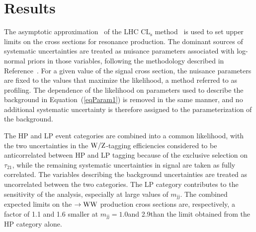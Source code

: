 \newpage
\section{Results}
\label{sec:results1}


The asymptotic approximation~\cite{AsymptCLs} of the LHC
$\mathrm{CL_s}$ method~\cite{CLs1,CLs3} is used to set upper limits on
the cross sections for resonance production. The dominant sources of
systematic uncertainties are treated as nuisance parameters associated
with log-normal priors in those variables, following the methodology
described in Reference~\cite{ATLASCMSstat}. For a given value of the
signal cross section, the nuisance parameters are fixed to the values
that maximize the likelihood, a method referred to as
profiling. The dependence of the likelihood on parameters used to
describe the background in Equation~(\ref{eqParam1}) is removed in the same
manner, and no additional systematic uncertainty is therefore assigned
to the parameterization of the background.

The HP and LP event categories are combined into a common likelihood,
with the two uncertainties in the ${\rm W}/{\rm Z}$-tagging efficiencies
considered to be anticorrelated between HP and LP tagging because of
the exclusive selection on $\tau_{21}$, while the remaining systematic
uncertainties in signal are taken as fully correlated. The variables
describing the background uncertainties are treated as uncorrelated
between the two categories. The LP category contributes to the
sensitivity of the analysis, especially at large values of
$m_\mathrm{jj}$. The combined expected limits on the \GRS $\to{\rm W}{\rm W}$
production cross sections are, respectively, a factor of 1.1 and 1.6
smaller at $m_\mathrm{jj}=1.0$\TeVcc and 2.9\TeVcc than the limit
obtained from the HP category alone.



